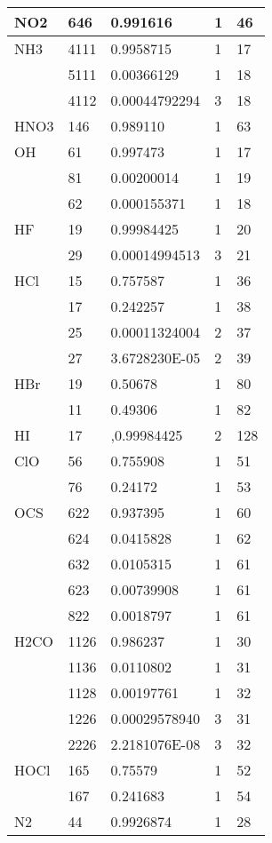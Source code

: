 \begin{longtable}{lllll}
\hline                  
  NO2& 646&  0.991616&  1&46\\
\hline                  
  NH3& 4111& 0.9958715&  1&17\\
     & 5111& 0.00366129&  1&18\\
     & 4112& 0.00044792294&  3&18\\
\hline                  
  HNO3& 146& 0.989110&  1&63\\
\hline                  
  OH& 61&  0.997473&  1&17\\
    & 81&  0.00200014&  1&19\\
    & 62&  0.000155371&  1&18\\
\hline                  
  HF& 19&  0.99984425&  1&20\\
    & 29&  0.00014994513&  3&21\\
\hline                  
  HCl& 15&  0.757587&  1&36\\
     & 17&  0.242257&  1&38\\
     & 25&  0.00011324004&  2&37\\
     & 27&  3.6728230E-05&  2&39\\
\hline                  
  HBr& 19&  0.50678&  1&80\\
     & 11&  0.49306&  1&82\\
\hline                  
  HI& 17&  ,0.99984425& 2&128\\
\hline                  
  ClO& 56&  0.755908&  1&51\\
     & 76&  0.24172&  1&53\\
\hline                  
  OCS& 622&  0.937395&  1&60\\
     & 624&  0.0415828&  1&62\\
     & 632&  0.0105315&  1&61\\
     & 623&  0.00739908 &1&61\\
     & 822&  0.0018797&1&61\\
\hline                  
  H2CO& 1126&  0.986237&  1&30\\
      & 1136&  0.0110802&  1&31\\
      & 1128&  0.00197761& 1&32\\
      & 1226&  0.00029578940&  3&31\\
      & 2226&  2.2181076E-08&  3&32\\
\hline                  
  HOCl& 165&  0.75579&  1&52\\
      & 167&  0.241683&  1&54\\
\hline                  
  N2& 44&  0.9926874&  1&28\\

\end{longtable}
